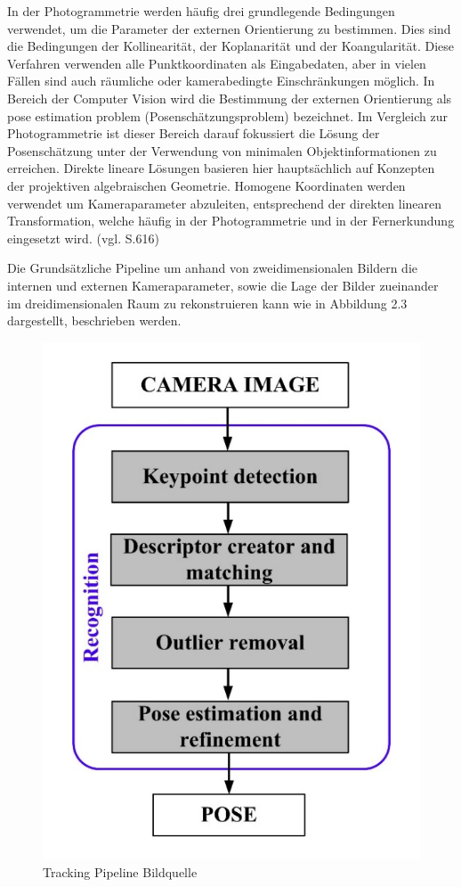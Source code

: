 In der Photogrammetrie werden häufig drei grundlegende Bedingungen verwendet, um die Parameter der externen Orientierung zu bestimmen. Dies sind die Bedingungen der Kollinearität, der Koplanarität und der Koangularität. Diese Verfahren verwenden alle Punktkoordinaten als Eingabedaten, aber in vielen Fällen sind auch räumliche oder kamerabedingte Einschränkungen möglich. In Bereich der Computer Vision wird die Bestimmung der externen Orientierung als \glqq pose estimation problem\grqq{} (Posenschätzungsproblem) bezeichnet. Im Vergleich zur Photogrammetrie ist dieser Bereich darauf fokussiert die Lösung der Posenschätzung unter der Verwendung von minimalen Objektinformationen zu erreichen. Direkte lineare Lösungen basieren hier hauptsächlich auf Konzepten der projektiven algebraischen Geometrie. Homogene Koordinaten werden verwendet um Kameraparameter abzuleiten, entsprechend der direkten linearen Transformation, welche häufig in der Photogrammetrie und in der Fernerkundung eingesetzt wird. (vgl. \cite{exterior_review} S.616)

Die Grundsätzliche Pipeline um anhand von zweidimensionalen Bildern die internen und externen Kameraparameter, sowie die Lage der Bilder zueinander im dreidimensionalen Raum zu rekonstruieren kann wie in Abbildung 2.3 dargestellt, beschrieben werden.

\begin{figure}[H]
	\centering
	\includegraphics[scale=0.5]{tracking_pipeline.png}
	\caption{Tracking Pipeline Bildquelle \cite{natural_feature}}
\end{figure} 

